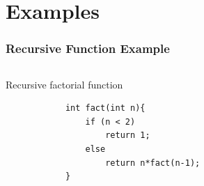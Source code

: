 \documentclass[
	10pt, %
	hmargin=1cm,vmargin=0cm,head=0.5cm,headsep=0pt,foot=0.5cm,margin=2cm
]{beamer}
\begin{document}
\section{Examples}
\begin{frame}[fragile]
	\frametitle{Recursive Function Example} 
	\begin{columns}[c]
		\begin{column}{0.4\textwidth}
					
			\begin{listing}[H]
			\centering			
			\caption{Recursive factorial function}
			\begin{verbatim}
			int fact(int n){
				if (n < 2)
					return 1;
				else
					return n*fact(n-1);
			}
			\end{verbatim}
			\end{listing}
			

\end{column}
\end{columns}
\end{frame}
\end{document}
